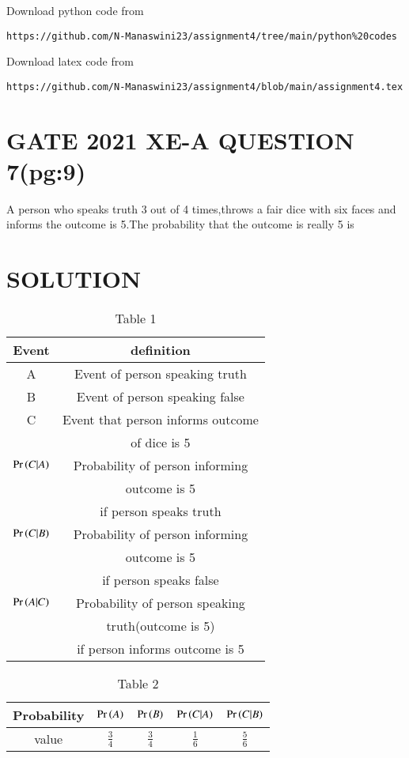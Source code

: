 \documentclass[journal,12pt,twocolumn]{IEEEtran}
\begin{document}
\renewcommand{\thefigure}{\theenumi}
\renewcommand{\thetable}{\theenumi}
Download python code from 
\begin{lstlisting}
https://github.com/N-Manaswini23/assignment4/tree/main/python%20codes
\end{lstlisting}
%
Download latex code from 
\begin{lstlisting}
https://github.com/N-Manaswini23/assignment4/blob/main/assignment4.tex
\end{lstlisting}
%

\section*{GATE 2021 XE-A QUESTION 7(pg:9)}
A person who speaks truth 3 out of 4 times,throws a fair dice with six faces and informs the outcome is 5.The probability that the outcome is really 5 is \\ 
\section*{SOLUTION}
\begin{table}[h!]
\resizebox{9.43cm}{!}
{ 
\begin{tabular}{|c|c|}
\hline
Event & definition \\
\hline
A & Event of person speaking truth\\
\hline
B & Event of person speaking false\\
\hline
C  & Event that person informs outcome\\
& of dice is 5 \\
\hline
$\Pr\left(C|A\right)$ & Probability of person informing \\
& outcome is 5\\
& if person speaks truth\\
\hline
$\Pr\left(C|B\right)$ & Probability of person informing \\
&outcome is 5\\
& if person speaks false\\ 
\hline
$\Pr\left(A|C\right)$ & Probability of person speaking\\
& truth(outcome is 5) \\
& if person informs outcome is 5\\
\hline
\end{tabular}
}
\caption{Table 1} 
\label{tab:1}
\end{table}

\begin{table}[h!]
\resizebox{9.5cm}{!}
{ 
\begin{tabular}{|c|c|c|c|c|}
\hline
Probability & $\Pr\left(A\right)$ & $\Pr\left(B\right)$ & $\Pr\left(C|A\right)$ & $\Pr\left(C|B\right)$ \\
\hline
value & $\frac{3}{4}$ &  $\frac{3}{4}$ &  $\frac{1}{6}$ &  $\frac{5}{6}$ \\
\hline
\end{tabular}
}
\caption{Table 2} 
\label{tab:2}
\end{table}
\end{document}
